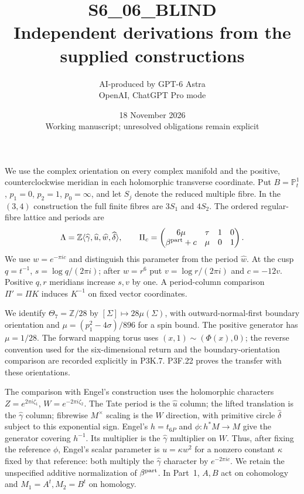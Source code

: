 \documentclass[11pt,a4paper]{article}
\title{S6\_06\_BLIND\\Independent derivations from the supplied constructions}
\author{AI-produced by GPT-6 Astra\\OpenAI, ChatGPT Pro mode}
\date{18 November 2026\\Working manuscript; unresolved obligations remain explicit}
\newcommand{\Z}{\mathbb Z}
\newcommand{\Pp}{\mathbb P}
\begin{document}
\maketitle
\noindent We use the complex orientation on every complex manifold and the positive, counterclockwise meridian in each holomorphic transverse coordinate. Put $B=\Pp^1_t$, $p_1=0$, $p_2=1$, $p_0=\infty$, and let $S_j$ denote the reduced multiple fibre. In the $(3,4)$ construction the full finite fibres are $3S_1$ and $4S_2$. The ordered regular-fibre lattice and periods are
\[
 \Lambda=\Z\langle\widehat\gamma,\widehat u,\widehat w,\widehat\delta\rangle,
 \qquad\Pi_c=\begin{pmatrix}6\mu&\tau&1&0\\ \beta^{\rm part}+c&\mu&0&1\end{pmatrix}.
\]
We use $w=e^{-\pi i c}$ and distinguish this parameter from the period $\widehat w$. At the cusp $q=t^{-1}$, $s=\log q/(2\pi i)$; after $w=r^6$ put $v=\log r/(2\pi i)$ and $c=-12v$. Positive $q,r$ meridians increase $s,v$ by one. A period-column comparison $\Pi'=\Pi K$ induces $K^{-1}$ on fixed vector coordinates.

We identify $\Theta_7=\Z/28$ by $[\Sigma]\mapsto28\mu(\Sigma)$, with outward-normal-first boundary orientation and $\mu=(p_1^2-4\sigma)/896$ for a spin bound. The positive generator has $\mu=1/28$. The forward mapping torus uses $(x,1)\sim(\Phi(x),0)$; the reverse convention used for the six-dimensional return and the boundary-orientation comparison are recorded explicitly in P3K.7. P3F.22 proves the transfer with these orientations.

The comparison with Engel's construction uses the holomorphic characters $Z=e^{2\pi i\zeta_1}$, $W=e^{-2\pi i\zeta_2}$. The Tate period is the $\widehat u$ column; the lifted translation is the $\widehat\gamma$ column; fibrewise $M^\times$ scaling is the $W$ direction, with primitive circle $\widehat\delta$ subject to this exponential sign. Engel's $h=t_{6P}$ and $\phi:h^*M\to M$ give the generator covering $h^{-1}$. Its multiplier is the $\widehat\gamma$ multiplier on $W$. Thus, after fixing the reference $\phi$, Engel's scalar parameter is $u=\kappa w^2$ for a nonzero constant $\kappa$ fixed by that reference: both multiply the $\widehat\gamma$ character by $e^{-2\pi ic}$. We retain the unspecified additive normalization of $\beta^{\rm part}$. In Part~1, $A,B$ act on cohomology and $M_1=A^t,M_2=B^t$ on homology.
\tableofcontents\clearpage
{}

\end{document}
